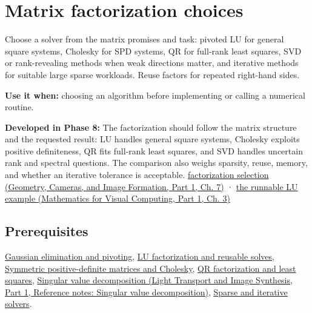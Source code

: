 \hypertarget{appendix-221a483bec2d}{}\label{referencestart:appendix-221a483bec2d}
\section{Matrix factorization choices}\label{appendix-221a483bec2d-matrix-factorization-choices}

\hypertarget{appendix-221a483bec2d-matrix-factorization-choices}{}

Choose a solver from the matrix promises and task: pivoted LU for general square systems, Cholesky for SPD systems, QR for full-rank least squares, SVD or rank-revealing methods when weak directions matter, and iterative methods for suitable large sparse workloads. Reuse factors for repeated right-hand sides.

\textbf{Use it when:} choosing an algorithm before implementing or calling a numerical routine.

\textbf{Developed in Phase 8:} The factorization should follow the matrix structure and the requested result: LU handles general square systems, Cholesky exploits positive definiteness, QR fits full-rank least squares, and SVD handles uncertain rank and spectral questions. The comparison also weighs sparsity, reuse, memory, and whether an iterative tolerance is acceptable. \href{../03-Geometry-Cameras-and-Image-Formation-P01/main.pdf\#02-foundations-ii-ch038-choose-a-factorization-from-structure-and-the-requested-answer}{factorization selection (Geometry, Cameras, and Image Formation, Part 1, Ch. 7)} · \href{../02-Mathematics-for-Visual-Computing-P01/main.pdf\#01-foundations-i-ch019-a-runnable-pivoted-lu-reference-preserves-the-elimination-history}{the runnable LU example (Mathematics for Visual Computing, Part 1, Ch. 3)}

\subsection{Prerequisites}\label{appendix-221a483bec2d-prerequisites}

\hypertarget{appendix-221a483bec2d-prerequisites}{}

\hyperref[appendix-f6e77f4a200f]{Gaussian elimination and pivoting}, \hyperref[appendix-55e4b5b0a1e6]{LU factorization and reusable solves}, \hyperref[appendix-50d2ea3c9b26]{Symmetric positive-definite matrices and Cholesky}, \hyperref[appendix-c3421e6b4f2c]{QR factorization and least squares}, \href{../04-Light-Transport-and-Image-Synthesis-P01/main.pdf\#appendix-1fad5e7f36fa}{Singular value decomposition (Light Transport and Image Synthesis, Part 1, Reference notes: Singular value decomposition)}, \hyperref[appendix-67c87a3d9e94]{Sparse and iterative solvers}.

